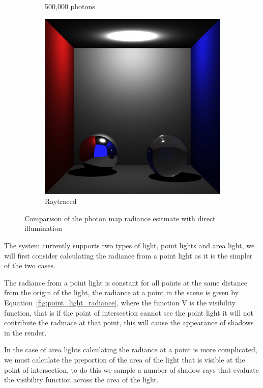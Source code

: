 \begin{figure}[h]
\begin{subfigure}[c]{0.3\textwidth}
	\caption{500,000 photons}
	\end{subfigure}
	\begin{subfigure}[c]{0.3\textwidth}
	\includegraphics[width=\textwidth]{./images/renders/direct_photon_comp/direct.png}
	\caption{Raytraced}
	\end{subfigure}
	\caption{Comparison of the photon map radiance esitmate with direct illumination}
\label{fig:direct_compare}
\end{figure}

The system currently supports two types of light, point lights and area light, we will first consider calculating the radiance
from a point light as it is the simpler of the two cases.

The radiance from a point light is constant for all points at the same distance from the origin of the light, the radiance at
a point in the scene is given by Equation~\ref{fig:point_light_radiance}, where the function V is the visibility function, that
is if the point of intersection cannot see the point light it will not contribute the radinace at that point, this will cause
the appearance of shadows in the render.

In the case of area lights calculating the radiance at a point is more complicated, we must calculate the preportion of the
area of the light that is visible at the point of intersection, to do this we sample a number of shadow rays that evaluate the
visibility function across the area of the light.

